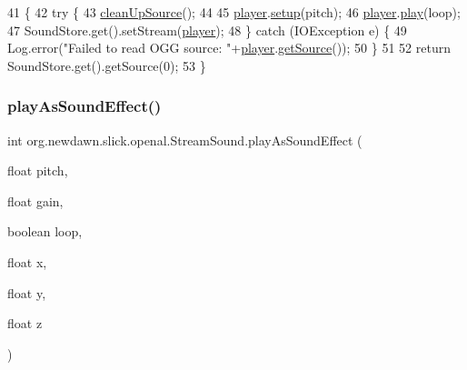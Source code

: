 \begin{DoxyCode}
41                                                                   \{
42         \textcolor{keywordflow}{try} \{
43             \mbox{\hyperlink{classorg_1_1newdawn_1_1slick_1_1openal_1_1_stream_sound_aa5c0c9541188f59c8786852419f9c7c2}{cleanUpSource}}();
44             
45             \mbox{\hyperlink{classorg_1_1newdawn_1_1slick_1_1openal_1_1_stream_sound_a5e4d0d6e22af804ce94996f6ab90872f}{player}}.\mbox{\hyperlink{classorg_1_1newdawn_1_1slick_1_1openal_1_1_open_a_l_stream_player_a7bfabcfeaa56d6561604d3936d9d1a51}{setup}}(pitch);
46             \mbox{\hyperlink{classorg_1_1newdawn_1_1slick_1_1openal_1_1_stream_sound_a5e4d0d6e22af804ce94996f6ab90872f}{player}}.\mbox{\hyperlink{classorg_1_1newdawn_1_1slick_1_1openal_1_1_open_a_l_stream_player_a6b07841e79d68f51bbc8fd33527e296a}{play}}(loop);
47             SoundStore.get().setStream(\mbox{\hyperlink{classorg_1_1newdawn_1_1slick_1_1openal_1_1_stream_sound_a5e4d0d6e22af804ce94996f6ab90872f}{player}});
48         \} \textcolor{keywordflow}{catch} (IOException e) \{
49             Log.error(\textcolor{stringliteral}{"Failed to read OGG source: "}+\mbox{\hyperlink{classorg_1_1newdawn_1_1slick_1_1openal_1_1_stream_sound_a5e4d0d6e22af804ce94996f6ab90872f}{player}}.\mbox{\hyperlink{classorg_1_1newdawn_1_1slick_1_1openal_1_1_open_a_l_stream_player_ac995066157d65c9191cbdb7ef2c0d2f4}{getSource}}());
50         \}
51         
52         \textcolor{keywordflow}{return} SoundStore.get().getSource(0);
53     \}
\end{DoxyCode}
\mbox{\label{classorg_1_1newdawn_1_1slick_1_1openal_1_1_stream_sound_abe05a7275f7f2918b9ff19226dece301}} 
\subsubsection{\texorpdfstring{play\+As\+Sound\+Effect()}{playAsSoundEffect()}\hspace{0.1cm}{\footnotesize\ttfamily [1/2]}}
{\footnotesize\ttfamily int org.\+newdawn.\+slick.\+openal.\+Stream\+Sound.\+play\+As\+Sound\+Effect (\begin{DoxyParamCaption}\item[{float}]{pitch,  }\item[{float}]{gain,  }\item[{boolean}]{loop,  }\item[{float}]{x,  }\item[{float}]{y,  }\item[{float}]{z }\end{DoxyParamCaption})\hspace{0.3cm}{\ttfamily [inline]}}

